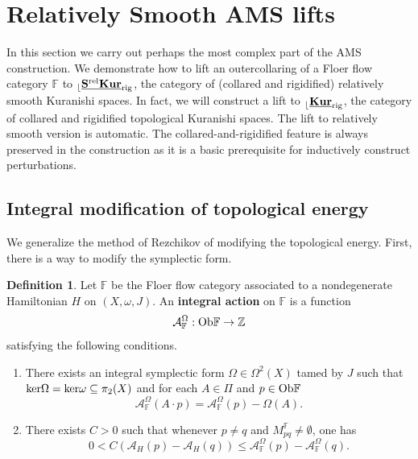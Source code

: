 \documentclass[reqno, 10pt]{amsart}
\numberwithin{equation}{section}
\numberwithin{equation}{section}
\renewcommand{\subset}{\subseteq}
\theoremstyle{definition}
\newtheorem{defn}[thm]{Definition}
\theoremstyle{remark}
\newcommand{\beqn}{\begin{equation*}}
\newcommand{\eeqn}{\end{equation*}}
\newcommand{\mb}{\mathbb}
\newcommand{\mc}{\mathcal}
\renewcommand{\outer}{{}_{\lfloor}}
\newcommand{\uds}[1]{\underline{\smash{#1}}}
\begin{document}
\section{Relatively Smooth AMS lifts}\label{section_Floer_lift}

In this section we carry out perhaps the most complex part of the AMS construction. We demonstrate how to lift an outercollaring of a Floer flow category ${\mb F}$ to $\outer \uds{\bf S^{\rm rel}Kur}_{\rm rig}$, the category of (collared and rigidified) relatively smooth Kuranishi spaces. In fact, we will construct a lift to $\outer \uds{\bf Kur}_{\rm rig}$, the category of collared and rigidified topological Kuranishi spaces. The lift to relatively smooth version is automatic. The collared-and-rigidified feature is always preserved in the construction as it is a basic prerequisite for inductively construct perturbations.



\subsection{Integral modification of topological energy}

We generalize the method of Rezchikov \cite{Rezchikov_Arnold} of modifying the topological energy. First, there is a way to modify the symplectic form.

\begin{defn}\label{defn_integral_modification}
Let ${\mb F}$ be the Floer flow category associated to a nondegenerate Hamiltonian $H$ on $(X, \omega, J)$. An {\bf integral action} on ${\mb F}$ is a  function
\beqn
{\mc A}_{\mb F}^\Omega: {\rm Ob}{\mb F} \to {\mb Z}
\eeqn
satisfying the following conditions.
\begin{enumerate}

\item There exists an integral symplectic form $\Omega \in \Omega^2(X)$ tamed by $J$ such that ${\rm ker}\Omega = {\rm ker} \omega \subset \pi_2(X)$ and for each $A \in \Pi$ and $p \in {\rm Ob}{\mb F}$
\beqn
{\mc A}_{\mb F}^\Omega(A\cdot p) = {\mc A}^\Omega_{\mb F} (p) - \Omega(A).
\eeqn

\item There exists $C>0$ such that whenever $p \neq q$ and $M_{pq}^{\mb F} \neq \emptyset$, one has
\beqn
0 <  C \left(  {\mc A}_H(p) - {\mc A}_H(q) \right) \leq {\mc A}^\Omega_{\mb F}(p) - {\mc A}^\Omega_{\mb F}(q).
\eeqn
\end{enumerate}
\end{defn}
\end{document}
